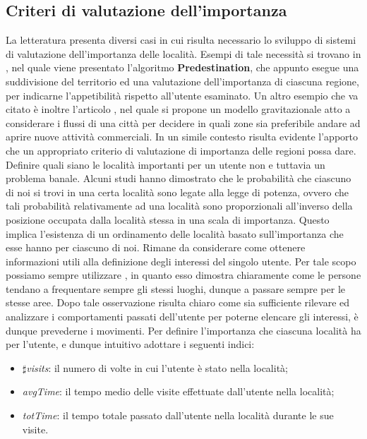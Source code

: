 \subsection{Criteri di valutazione dell'importanza}
La letteratura presenta diversi casi in cui risulta necessario lo sviluppo di sistemi
di valutazione dell'importanza delle localit\`a.
Esempi di tale necessit\`a si trovano in \cite{cit_42}, nel quale viene presentato l'algoritmo
\textbf{Predestination}, che appunto esegue una suddivisione del territorio ed una
valutazione dell'importanza di ciascuna regione, per indicarne l'appetibilit\`a
rispetto all'utente esaminato. Un altro esempio che va citato \`e inoltre l'articolo
\cite{cit_43}, nel quale si propone un modello gravitazionale atto a considerare i
flussi di una citt\`a per decidere in quali zone sia preferibile andare ad aprire
nuove attivit\`a commerciali. In un simile contesto risulta evidente l'apporto che
un appropriato criterio di valutazione di importanza delle regioni possa dare.
Definire quali siano le localit\`a importanti per un utente non e tuttavia un
problema banale. Alcuni studi \cite{cit_44} hanno dimostrato che le probabilit\`a che
ciascuno di noi si trovi in una certa localit\`a sono legate alla legge di potenza,
ovvero che tali probabilit\`a relativamente ad una localit\`a sono proporzionali
all'inverso della posizione occupata dalla localit\`a stessa in una scala di importanza.
Questo implica l'esistenza di un ordinamento delle localit\`a basato sull'importanza
che esse hanno per ciascuno di noi. Rimane da considerare come
ottenere informazioni utili alla definizione degli interessi del singolo utente. Per
tale scopo possiamo sempre utilizzare \cite{cit_44}, in quanto esso dimostra chiaramente
come le persone tendano a frequentare sempre gli stessi luoghi, dunque
a passare sempre per le stesse aree. Dopo tale osservazione risulta chiaro come
sia sufficiente rilevare ed analizzare i comportamenti passati dell'utente per
poterne elencare gli interessi, \`e dunque prevederne i movimenti.
Per definire l'importanza che ciascuna localit\`a ha per l'utente, e dunque
intuitivo adottare i seguenti indici:
\begin{itemize}
\item $\sharp$\textit{visits}: il numero di volte in cui l'utente \`e stato nella localit\`a;
\item \textit{avgTime}: il tempo medio delle visite effettuate dall'utente nella localit\`a;
\item \textit{totTime}: il tempo totale passato dall'utente nella localit\`a durante le sue visite.
\end{itemize}
